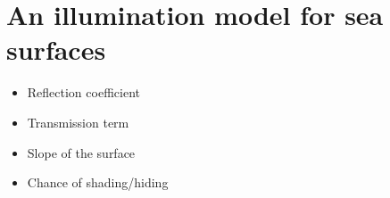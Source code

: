 \chapter{An illumination model for sea surfaces}
\label{chap:illumination_model_derivation}

\begin{itemize}
\item Reflection coefficient
\item Transmission term
\item Slope of the surface
\item Chance of shading/hiding
\end{itemize}

\HRule

